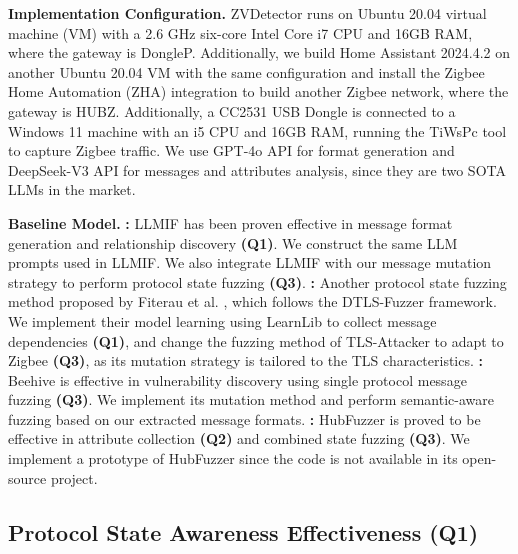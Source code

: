 \documentclass[10pt,journal,compsoc]{IEEEtran}
\begin{document}
\textbf{Implementation Configuration.} ZVDetector runs on Ubuntu 20.04 virtual machine (VM) with a 2.6 GHz six-core Intel Core i7 CPU and 16GB RAM, where the gateway is DongleP. Additionally, we build Home Assistant 2024.4.2 on another Ubuntu 20.04 VM with the same configuration and install the Zigbee Home Automation (ZHA) integration to build another Zigbee network, where the gateway is HUBZ. Additionally, a CC2531 USB Dongle is connected to a Windows 11 machine with an i5 CPU and 16GB RAM, running the TiWsPc \cite{timac} tool to capture Zigbee traffic. We use GPT-4o API for format generation and DeepSeek-V3 API for messages and attributes analysis, since they are two SOTA LLMs in the market. \vspace{0.1cm}

\textbf{Baseline Model.} \textbf{{\color{Orange}{B1}}:} LLMIF \cite{wang2024llmif} has been proven effective in message format generation and relationship discovery \textbf{(Q1)}. We construct the same LLM prompts used in LLMIF. We also integrate LLMIF with our message mutation strategy to perform protocol state fuzzing \textbf{(Q3)}. \textbf{{\color{Orange}{B2}}:} Another protocol state fuzzing method proposed by Fiterau et al. \cite{fiterau2020analysis, fiterau2023automata}, which follows the DTLS-Fuzzer \cite{fiteruau2022dtls} framework. We implement their model learning using LearnLib \cite{learnlib} to collect message dependencies \textbf{(Q1)}, and change the fuzzing method of TLS-Attacker  \cite{tlsattacker} to adapt to Zigbee \textbf{(Q3)}, as its mutation strategy is tailored to the TLS characteristics. \textbf{{\color{Orange}{B3}}:} Beehive \cite{wang2022don} is effective in vulnerability discovery using single protocol message fuzzing \textbf{(Q3)}. We implement its mutation method and perform semantic-aware fuzzing based on our extracted message formats. \textbf{{\color{Orange}{B4}}:} HubFuzzer \cite{ma2023no} is proved to be effective in attribute collection \textbf{(Q2)} and combined state fuzzing \textbf{(Q3)}. We implement a prototype of HubFuzzer since the code is not available in its open-source project.

\subsection{Protocol State Awareness Effectiveness (Q1)} \label{7-3}
\end{document}
